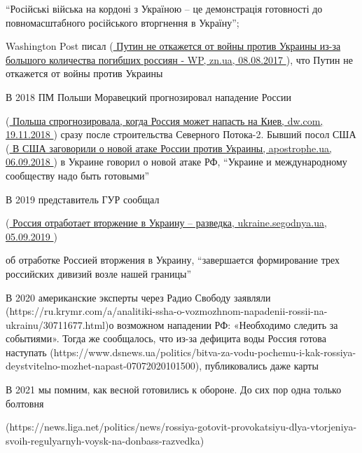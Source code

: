 \enquote{Російські війська на кордоні з Україною – це демонстрація готовності до
повномасштабного російського вторгнення в Україну}; 

Washington Post писал
(\href{https://zn.ua/UKRAINE/putin-ne-otkazhetsya-ot-voyny-protiv-ukrainy-iz-za-bolshogo-kolichestva-pogibshih-rossiyan-wp-256547_.html}{%
Путин не откажется от войны против Украины из-за большого количества погибших россиян - WP, %
zn.ua, 08.08.2017%
}),
что Путин не откажется от войны против Украины

В 2018 ПМ Польши Моравецкий прогнозировал нападение России

(\href{https://www.dw.com/ru/%D0%BF%D0%BE%D0%BB%D1%8C%D1%88%D0%B0-%D1%81%D0%BF%D1%80%D0%BE%D0%B3%D0%BD%D0%BE%D0%B7%D0%B8%D1%80%D0%BE%D0%B2%D0%B0%D0%BB%D0%B0-%D0%BA%D0%BE%D0%B3%D0%B4%D0%B0-%D1%80%D0%BE%D1%81%D1%81%D0%B8%D1%8F-%D0%BC%D0%BE%D0%B6%D0%B5%D1%82-%D0%BD%D0%B0%D0%BF%D0%B0%D1%81%D1%82%D1%8C-%D0%BD%D0%B0-%D0%BA%D0%B8%D0%B5%D0%B2/a-46351227}{%
Польша спрогнозировала, когда Россия может напасть на Киев, dw.com, 19.11.2018%
}
)
сразу после строительства Северного Потока-2. Бывший посол США
(\href{https://apostrophe.ua/news/society/accidents/2018-12-06/v-ssha-zagovorili-o-novoy-atake-rossii-protiv-ukrainyi/148030}{%
В США заговорили о новой атаке России против Украины, apostrophe.ua, 06.09.2018%
})
в Украине говорил о новой атаке РФ, \enquote{Украине и международному сообществу надо
быть готовыми}

В 2019 представитель ГУР сообщал

(\href{https://ukraine.segodnya.ua/ukraine/rossiya-otrabotaet-vtorzhenie-v-ukrainu-ukrainskaya-razvedka-1326694.html}{%
Россия отработает вторжение в Украину – разведка, ukraine.segodnya.ua, 05.09.2019%
})

об отработке Россией вторжения в Украину, \enquote{завершается формирование трех
российских дивизий возле нашей границы}

В 2020 американские эксперты через Радио Свободу заявляли
(https://ru.krymr.com/a/analitiki-ssha-o-vozmozhnom-napadenii-rossii-na-ukrainu/30711677.html)о
возможном нападении РФ: «Необходимо следить за событиями». Тогда же сообщалось,
что из-за дефицита воды Россия готова наступать
(https://www.dsnews.ua/politics/bitva-za-vodu-pochemu-i-kak-rossiya-deystvitelno-mozhet-napast-07072020101500),
публиковались даже карты

В 2021 мы помним, как весной готовились к обороне. До сих пор одна только
болтовня

(https://news.liga.net/politics/news/rossiya-gotovit-provokatsiyu-dlya-vtorjeniya-svoih-regulyarnyh-voysk-na-donbass-razvedka)


